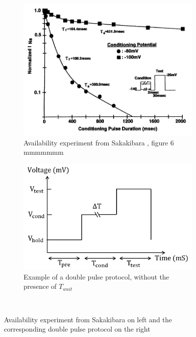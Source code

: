 \documentclass[11pt]{report}
\begin{document}
\begin{figure}[H]
    \centering
    \captionsetup{singlelinecheck = false, format= hang, justification=centerlast, font=footnotesize, labelsep=space}
    \begin{subfigure}[b]{0.49\textwidth}
    \centering
        \includegraphics[width=\linewidth]{figures/AvailSaka.png}
        \caption{Availability experiment from Sakakibara \cite{Sakakibara1992}, figure 6 {\color{white} mmmmmmm }}
    \end{subfigure}
    \begin{subfigure}[b]{0.49\textwidth}
    \centering
        \includegraphics[width=\linewidth]{figures/AvailProtocol.png}
        \caption{Example of a double pulse protocol, without the presence of $T_{wait}$}
    \end{subfigure}

    ~
    \caption{Availability experiment from Sakakibara \cite{Sakakibara1992} on left and the corresponding double pulse protocol on the right}
    \label{fig:AvailSaka}
\end{figure}
\end{document}
